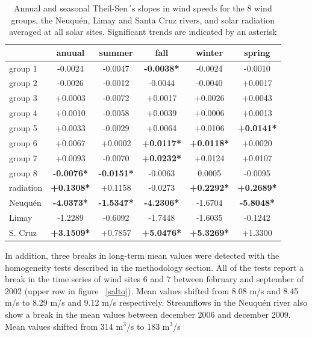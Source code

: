 \documentclass[AMA,Times1COL]{WileyNJDv5} %
\begin{document}
\begin{linenumbers}
\begin{table}[hbpt]
	\caption{Annual and seasonal Theil-Sen´s slopes in wind speeds for the 8 wind groups, the Neuquén, Limay and Santa Cruz rivers, and solar radiation averaged at all solar sites. Significant trends are indicated by an asterisk}
	\label{trendw}
	\begin{tabular}{l|ccccc}
		
		& anuual & summer & fall & winter & spring \\
		\hline
		
		group 1  &  -0.0024  &  -0.0047  &  \textbf{-0.0038*} &  -0.0024  &  -0.0010 \\
		group 2  &  -0.0026  &  -0.0012  &  -0.0044  &  -0.0040  &  +0.0017  \\
		group 3  &  +0.0003  &  -0.0072  &  +0.0017   &  +0.0026  &  +0.0043  \\
		group 4  &  +0.0010  &  -0.0058  &  +0.0039  &  +0.0006  &  +0.0013	  \\
		group 5  &  +0.0033  &  -0.0029  &  +0.0064  &  +0.0106  &  \textbf{+0.0141*}  \\
		group 6  &  +0.0067  &  +0.0002  &  \textbf{+0.0117*}  &  \textbf{+0.0118*}  &  +0.0020  \\
		group 7  &  +0.0093  &  -0.0070  &  \textbf{+0.0232*}  &  +0.0124  &  +0.0107 \\
		group 8  &  \textbf{-0.0076*} &  \textbf{-0.0151*} &  -0.0063  &  0.0005  &  -0.0095   \\
		radiation  &  \textbf{+0.1308*} &  +0.1158 &  -0.0273  &  \textbf{+0.2292*}  & \textbf{+0.2689*}  \\
		Neuquén  &  \textbf{-4.0373*}  &  \textbf{-1.5347*}  &  \textbf{-4.2306*}  &  -1.6704  & \textbf{-5.8048*}   \\
		Limay  &  -1.2289  & -0.6092  &  -1.7448  &  -1.6035  &  -0.1242  \\
		S. Cruz  &  \textbf{+3.1509*}  &  +0.7857 &  \textbf{+5.0476*} & \textbf{+5.3269*}  &  +1.3300   \\
		
		
	\end{tabular}
\end{table}

In addition, three breaks in long-term mean values were detected with the homogeneity tests described in the methodology section. All of the tests report a break in the time series of wind sites 6 and 7 between february and september of 2002 (upper row in figure ~\ref{salto}). Mean values shifted from 8.08 m/s and 8.45 m/s to 8.29 m/s and 9.12 m/s respectively. Streamflows in the Neuquén river also show a break in the mean values between december 2006 and december 2009. Mean values shifted from 314 m$^3$/s to 183 m$^3$/s


\end{linenumbers}
\end{document}
